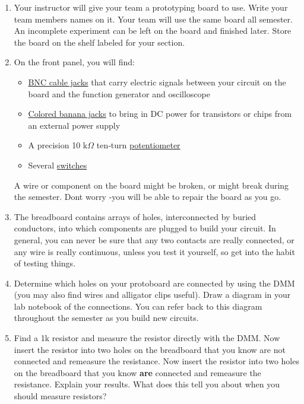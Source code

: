 \documentclass[10pt]{PhysLab1C} %
\begin{document}
\begin{enumerate}
\def\labelenumi{\arabic{enumi}.}
\item
  Your instructor will give your team a prototyping board to use. Write
  your team member\textquotesingle s names on it. Your team will use the
  same board all semester. An incomplete experiment can be left on the
  board and finished later. Store the board on the shelf labeled for
  your section.
\item
  On the front panel, you will find:

  \begin{itemize}
  \item
    \underline{BNC cable jacks} that carry electric signals between your
    circuit on the board and the function generator and oscilloscope
  \end{itemize}

  \begin{itemize}
  \item
    \underline{Colored banana jacks} to bring in DC power for transistors or
    chips from an external power supply
  \end{itemize}

  \begin{itemize}
  \item
    A precision 10 k$\Omega$ ten‑turn \underline{potentiometer}
  \end{itemize}

  \begin{itemize}
  \item
    Several \underline{switches}
  \end{itemize}

  A wire or component on the board might be broken, or might break
  during the semester. Don\textquotesingle t worry -you will be able to
  repair the board as you go.
\item
  The breadboard contains arrays of holes, interconnected by buried
  conductors, into which components are plugged to build your circuit.
  In general, you can never be sure that any two contacts are really
  connected, or any wire is really continuous, unless you test it
  yourself, so get into the habit of testing things.
\item
  Determine which holes on your protoboard are connected by using the
  DMM (you may also find wires and alligator clips useful). Draw a
  diagram in your lab notebook of the connections. You can refer back to
  this diagram throughout the semester as you build new circuits.
\item
  Find a 1k resistor and measure the resistor directly with the DMM. Now
  insert the resistor into two holes on the breadboard that you know are
  not connected and remeasure the resistance. Now insert the resistor
  into two holes on the breadboard that you know \textbf{are} connected
  and remeasure the resistance. Explain your results. What does this
  tell you about when you should measure resistors?
\end{enumerate}
\end{document}
